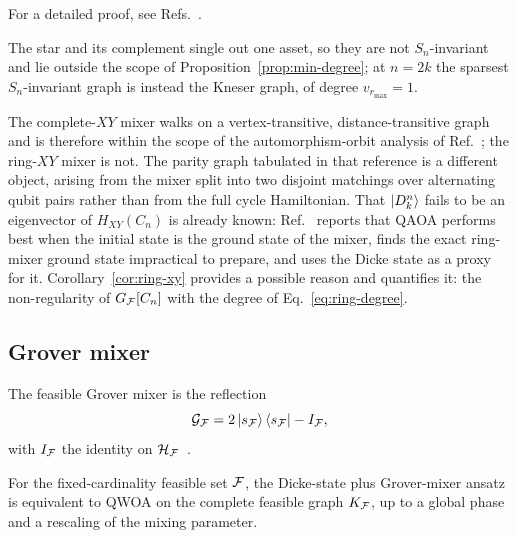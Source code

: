 {For a detailed proof, see Refs.~\cite{FabilaMonroy2012Token,Carballosa2017Regularity}.

\begin{remark}
The star and its complement single out one asset, so they are not $S_n$-invariant and lie outside the scope of Proposition~\ref{prop:min-degree}; at $n=2k$ the sparsest $S_n$-invariant graph is instead the Kneser graph, of degree $v_{r_{\max}}=1$.
\end{remark}

The complete-$XY$ mixer walks on a vertex-transitive, distance-transitive graph and is therefore within the scope of the automorphism-orbit analysis of Ref.~\cite{Matwiejew2024}; the ring-$XY$ mixer is not. The parity graph tabulated in that reference is a different object, arising from the mixer split into two disjoint matchings over alternating qubit pairs rather than from the full cycle Hamiltonian. That $\ket{D^n_k}$ fails to be an eigenvector of $H_{XY}(C_n)$ is already known: Ref.~\cite{He2023} reports that QAOA performs best when the initial state is the ground state of the mixer, finds the exact ring-mixer ground state impractical to prepare, and uses the Dicke state as a proxy for it. Corollary~\ref{cor:ring-xy} provides a possible reason and quantifies it: the non-regularity of $G_{\mathcal{F}}[C_n]$ with the degree of Eq.~\eqref{eq:ring-degree}.

\subsection{\label{subsec:grover}Grover mixer}

The feasible Grover mixer is the reflection
\begin{equation}
    \mathcal{G}_{\mathcal{F}}
    =
    2\ket{s_{\mathcal{F}}}\bra{s_{\mathcal{F}}}-I_{\mathcal{F}},
    \label{eq:grover-reflection}
\end{equation}
with $I_{\mathcal{F}}$ the identity on $\mathcal{H}_{\mathcal{F}}$~\cite{Bartschi2020,Bridi2024}.

\begin{proposition}
\label{prop:grover-complete-qwoa}
For the fixed-cardinality feasible set $\mathcal{F}$, the Dicke-state plus Grover-mixer ansatz is equivalent to QWOA on the complete feasible graph $K_{\mathcal{F}}$, up to a global phase and a rescaling of the mixing parameter.
\end{proposition}

}

